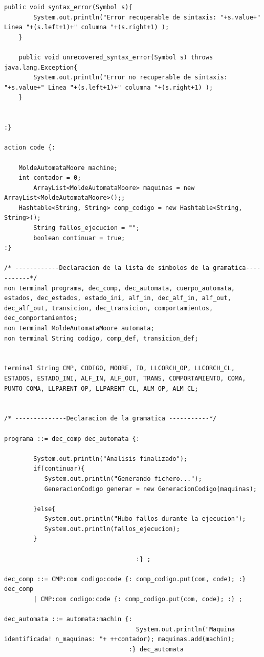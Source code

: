 \documentclass[12pt,a4paper]{article}
\begin{document}
\begin{lstlisting}[caption=Analizador Sintáctico y Semántico en CUP]
    public void syntax_error(Symbol s){
        System.out.println("Error recuperable de sintaxis: "+s.value+" Linea "+(s.left+1)+" columna "+(s.right+1) );
    }

    public void unrecovered_syntax_error(Symbol s) throws java.lang.Exception{ 
        System.out.println("Error no recuperable de sintaxis: "+s.value+" Linea "+(s.left+1)+" columna "+(s.right+1) );
    }

   
:}

action code {: 

	MoldeAutomataMoore machine;
	int contador = 0;
        ArrayList<MoldeAutomataMoore> maquinas = new ArrayList<MoldeAutomataMoore>();;
	Hashtable<String, String> comp_codigo = new Hashtable<String, String>();
        String fallos_ejecucion = "";
        boolean continuar = true;
:}

/* ------------Declaracion de la lista de simbolos de la gramatica-----------*/
non terminal programa, dec_comp, dec_automata, cuerpo_automata, estados, dec_estados, estado_ini, alf_in, dec_alf_in, alf_out, dec_alf_out, transicion, dec_transicion, comportamientos, dec_comportamientos;
non terminal MoldeAutomataMoore automata;
non terminal String codigo, comp_def, transicion_def;


terminal String CMP, CODIGO, MOORE, ID, LLCORCH_OP, LLCORCH_CL, ESTADOS, ESTADO_INI, ALF_IN, ALF_OUT, TRANS, COMPORTAMIENTO, COMA, PUNTO_COMA, LLPARENT_OP, LLPARENT_CL, ALM_OP, ALM_CL;


/* --------------Declaracion de la gramatica -----------*/

programa ::= dec_comp dec_automata {: 

        System.out.println("Analisis finalizado"); 
        if(continuar){
           System.out.println("Generando fichero...");
           GeneracionCodigo generar = new GeneracionCodigo(maquinas);
           
        }else{
           System.out.println("Hubo fallos durante la ejecucion"); 
           System.out.println(fallos_ejecucion);
        }

                                    :} ;

dec_comp ::= CMP:com codigo:code {: comp_codigo.put(com, code); :} dec_comp
		| CMP:com codigo:code {: comp_codigo.put(com, code); :} ;

dec_automata ::= automata:machin {: 
                                    System.out.println("Maquina identificada! n_maquinas: "+ ++contador); maquinas.add(machin); 
                                  :} dec_automata


\end{lstlisting}
\end{document}
